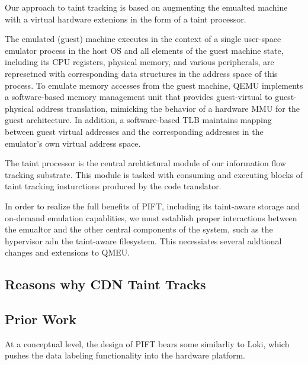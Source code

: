 Our approach to taint tracking is based on augmenting the emualted machine with
a virtual hardware extenions in the form of a taint processor.

The emulated (guest) machine executes in the context of a single user-space
emulator process in the host OS and all elements of the guest machine state,
including its CPU registers, physical memory, and various peripherals,
are represetned with corresponding data structures in the address
space of this process.  To emulate memory accesses from the guest machine, QEMU
implements a software-based memory management unit that provides guest-virtual
to guest-physical address translation, mimicking the behavior of a hardware MMU
for the guest architecture.  In addition, a software-based TLB maintains
mapping between guest virtual addresses and the corresponding addresses in the
emulator's own virtual address space.

The taint processor is the central arehtictural module of our information
flow tracking substrate.  This module is tasked with consuming and executing
blocks of taint tracking insturctions produced by the code translator.


In order to realize the full benefits of PIFT, including its taint-aware
storage and on-demand emulation capablities, we must establish proper
interactions between the emualtor and the other central components of the
system, such as the hypervisor adn the taint-aware filesystem.  This
necessiates several addtional changes and extensions to QMEU.





\subsection{Reasons why CDN Taint Tracks}



\subsection{Prior Work}
At a conceptual level, the design of PIFT bears some similarliy to Loki, which
pushes the data labeling functionality into the hardware platform.


